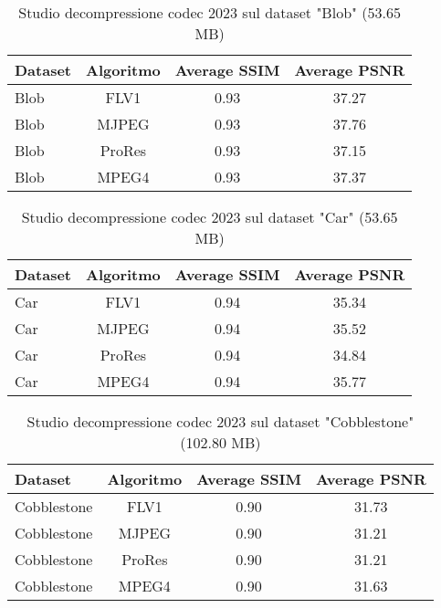 \begin{table}[ht]
\centering
\begin{tabular}{|l|c|c|c|}
\hline
Dataset               & Algoritmo & Average SSIM & Average PSNR \\ \hline
Blob                  & FLV1      & 0.93        & 37.27       \\ \hline
Blob                  & MJPEG     & 0.93        & 37.76       \\ \hline
Blob                  & ProRes    & 0.93        & 37.15       \\ \hline
Blob                  & MPEG4     & 0.93        & 37.37       \\ \hline
\end{tabular}
\caption{Studio decompressione codec 2023 sul dataset "Blob" (53.65 MB)}
\end{table}

\begin{table}[ht]
\centering
\begin{tabular}{|l|c|c|c|}
\hline
Dataset               & Algoritmo & Average SSIM & Average PSNR \\ \hline
Car                   & FLV1      & 0.94        & 35.34       \\ \hline
Car                   & MJPEG     & 0.94        & 35.52       \\ \hline
Car                   & ProRes    & 0.94        & 34.84       \\ \hline
Car                   & MPEG4     & 0.94        & 35.77       \\ \hline
\end{tabular}
\caption{Studio decompressione codec 2023 sul dataset "Car" (53.65 MB)}
\end{table}

\begin{table}[ht]
\centering
\begin{tabular}{|l|c|c|c|}
\hline
Dataset               & Algoritmo & Average SSIM & Average PSNR \\ \hline
Cobblestone           & FLV1      & 0.90        & 31.73       \\ \hline
Cobblestone           & MJPEG     & 0.90        & 31.21       \\ \hline
Cobblestone           & ProRes    & 0.90        & 31.21       \\ \hline
Cobblestone           & MPEG4     & 0.90        & 31.63       \\ \hline
\end{tabular}
\caption{Studio decompressione codec 2023 sul dataset "Cobblestone" (102.80 MB)}
\end{table}

